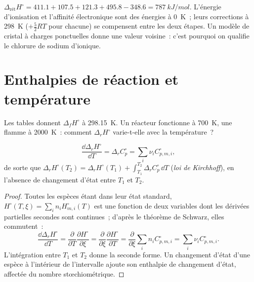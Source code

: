 \begin{example}\label{ex:b2:reaction-enthalpy:nacl}
$\Delta_{\text{rét}}H^\circ = 411.1 + 107.5 + 121.3 + 495.8 - 348.6 =
\qty{787}{kJ/mol}$. L'énergie d'ionisation et l'affinité électronique sont
des énergies à \qty{0}{K}~; leurs corrections à \qty{298}{K} ($+\tfrac52RT$
pour chacune) se compensent entre les deux étapes. Un modèle de cristal à charges ponctuelles
donne une valeur voisine~: c'est pourquoi on qualifie le chlorure de sodium d'ionique.
\end{example}

\section{Enthalpies de réaction et température}

Les tables donnent $\Delta_f H^\circ$ à \qty{298.15}{K}. Un réacteur fonctionne à
\qty{700}{K}, une flamme à \qty{2000}{K}~: comment $\Delta_r H^\circ$ varie-t-elle
avec la température~?

\begin{theorem}\label{thm:b2:reaction-enthalpy:kirchhoff}
\[
  \frac{\dd\Delta_r H^\circ}{\dd T} = \Delta_r C_p^\circ =
  \sum_i\nu_i C_{p,m,i}^\circ ,
\]
de sorte que $\Delta_r H^\circ(T_2) = \Delta_r H^\circ(T_1) + \int_{T_1}^{T_2}
\Delta_r C_p^\circ\,\dd T$ (\emph{loi de Kirchhoff}),
en l'absence de changement d'état entre $T_1$ et $T_2$.
\end{theorem}

\begin{proof}
Toutes les espèces étant dans leur état standard, $H^\circ(T, \xi) = \sum_in_i
H^\circ_{m,i}(T)$ est une fonction de deux variables dont les dérivées partielles
secondes sont continues~; d'après le théorème de Schwarz, elles commutent~:
\[
  \frac{\dd\Delta_r H^\circ}{\dd T} = \frac{\partial}{\partial T}
  \frac{\partial H^\circ}{\partial\xi} = \frac{\partial}{\partial\xi}
  \frac{\partial H^\circ}{\partial T} = \frac{\partial}{\partial\xi}
  \sum_in_iC^\circ_{p,m,i} = \sum_i\nu_iC^\circ_{p,m,i}.
\]
L'intégration entre $T_1$ et $T_2$ donne la seconde forme. Un changement
d'état d'une espèce à l'intérieur de l'intervalle ajoute son enthalpie de
changement d'état, affectée du nombre stœchiométrique.
\end{proof}

